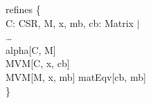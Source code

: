 \begin{myquote}
\Bassert refines \{\\
\TA \Ball C: CSR, M, x, mb, cb: Matrix $|$\\
\TB \ldots\\
\TB alpha[C, M] \Band\\
\TB MVM[C, x, cb] \Band\\
\TB MVM[M, x, mb] \Bimplies matEqv[cb, mb]\\
\}
\end{myquote}